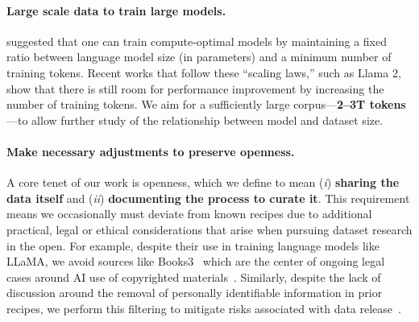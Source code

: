 \paragraph{Large scale data to train large models.} 
\citet{Hoffmann2022TrainingCL}  suggested that one can train compute-optimal models by maintaining a fixed ratio between language model size (in parameters) and a minimum number of training tokens. Recent works that follow these ``scaling laws,'' such as Llama 2, show that there is still room for performance improvement by increasing the number of training tokens.
We aim for a sufficiently large corpus---\textbf{2--3T tokens}---to allow further study of the relationship between model and dataset size.


\paragraph{Make necessary adjustments to preserve openness.}
A core tenet of our work is openness, which we define to mean (\textit{i}) \textbf{sharing the data itself} and (\textit{ii}) \textbf{documenting the process to curate it}. 
This requirement means we occasionally must deviate from known recipes due to additional practical, legal or ethical considerations that arise when pursuing dataset research in the open.
For example, despite their use in training language models like LLaMA, we avoid sources like Books3~\citep{Gao2020ThePA} which are the center of ongoing legal cases around AI use of copyrighted materials~\citep{books3copyright}.
Similarly, despite the lack of discussion around the removal of personally identifiable information in prior recipes, we perform this filtering to mitigate risks associated with data release~\citep{subramani-etal-2023-detecting}. 











